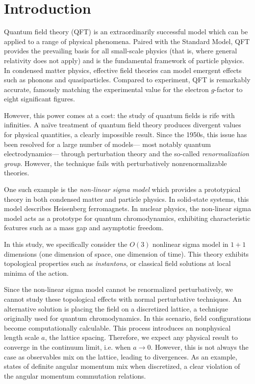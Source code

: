 \documentclass[12pt]{report}
\begin{document}
\chapter{Introduction}

Quantum field theory (QFT) is an extraordinarily successful model which can be applied to a range of physical phenomena. Paired with the Standard Model, QFT provides the prevailing basis for all small-scale physics (that is, where general relativity does not apply) and is the fundamental framework of particle physics. In condensed matter physics, effective field theories can model emergent effects such as phonons and quasiparticles. Compared to experiment, QFT is remarkably accurate, famously matching the experimental value for the electron $g$-factor to eight significant figures.\cite{weisskopf1981} 

However, this power comes at a cost: the study of quantum fields is rife with infinities. A na\"ive treatment of quantum field theory produces divergent values for physical quantities, a clearly impossible result. Since the 1950s, this issue has been resolved for a large number of models--- most notably quantum electrodynamics--- through perturbation theory and the so-called \textit{renormalization group}. However, the technique fails with perturbatively nonrenormalizable theories. 

One such example is the \textit{non-linear sigma model} which provides a prototypical theory in both condensed matter and particle physics. In solid-state systems, this model describes Heisenberg ferromagnets. In nuclear physics, the non-linear sigma model acts as a prototype for quantum chromodynamics, exhibiting characteristic features such as a mass gap and asymptotic freedom. %

In this study, we specifically consider the $O(3)$ nonlinear sigma model in $1+1$ dimensions (one dimension of space, one dimension of time). This theory exhibits topological properties such as \textit{instantons}, or classical field solutions at local minima of the action.

Since the non-linear sigma model cannot be renormalized perturbatively, we cannot study these topological effects with normal perturbative techniques. An alternative solution is placing the field on a discretized lattice, a technique originally used for quantum chromodynamics. In this scenario, field configurations become computationally calculable. This process introduces an nonphysical length scale $a$, the lattice spacing. Therefore, we expect any physical result to converge in the continuum limit, i.e. when $a\rightarrow 0$. However, this is not always the case as observables mix on the lattice, leading to divergences. As an example, states of definite angular momentum mix when discretized, a clear violation of the angular momentum commutation relations. 
\end{document}
